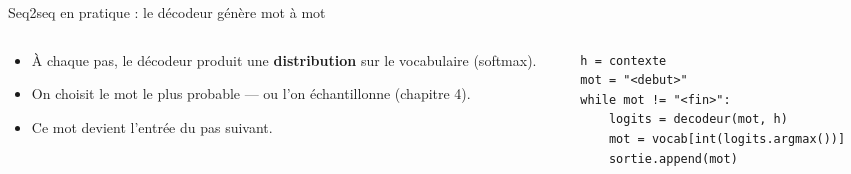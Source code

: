 \begin{frame}[fragile]{Seq2seq en pratique : le décodeur génère mot à mot}
\begin{columns}[t]
\begin{column}{0.52\textwidth}
\begin{itemize}
  \item À chaque pas, le décodeur produit une \textbf{distribution}
  sur le vocabulaire (softmax).
  \item On choisit le mot le plus probable --- ou l'on échantillonne
  (chapitre 4).
  \item Ce mot devient l'entrée du pas suivant.
\end{itemize}
\end{column}
\begin{column}{0.44\textwidth}
\begin{codebox}
\begin{lstlisting}
h = contexte
mot = "<debut>"
while mot != "<fin>":
    logits = decodeur(mot, h)
    mot = vocab[int(logits.argmax())]
    sortie.append(mot)
\end{lstlisting}
\end{codebox}
\end{column}
\end{columns}
\end{frame}

